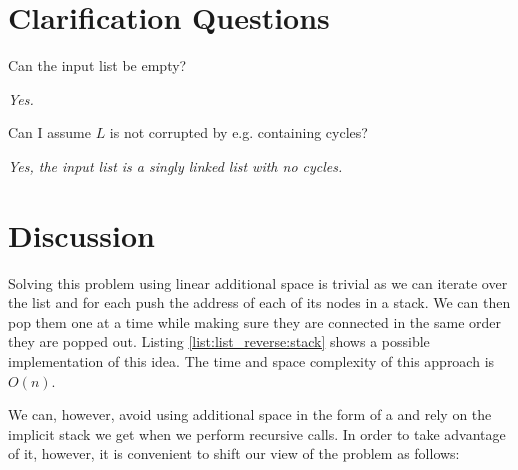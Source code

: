 \section{Clarification Questions}

\begin{QandA}
	\item \begin{questionitem} \begin{question} Can the input list be empty?   \end{question} 	 
    \begin{answered}
		\textit{Yes.}
	\end{answered} \end{questionitem}

	\item \begin{questionitem} \begin{question} Can I assume $L$ is not corrupted by e.g. containing cycles?   \end{question} 	 
    \begin{answered}
		\textit{Yes, the input list is a singly linked list with no cycles.}
	\end{answered} \end{questionitem}
	
\end{QandA}

\section{Discussion}
\label{list_reverse:sec:discussion}
Solving this problem using linear additional space is trivial as we can iterate over the list
and for each push the address of each of its nodes in a stack. We can then pop them one at a time
while making sure they are connected in the same order they are popped out. Listing
\ref{list:list_reverse:stack} shows a possible implementation of this idea. The time and space
complexity of this approach is $O(n)$.



We can,  however,  avoid using additional space in the form of a  and rely on the
implicit stack we get when we perform recursive calls. In order to take advantage of it, however, it is 
convenient to shift our view of the problem as follows:

